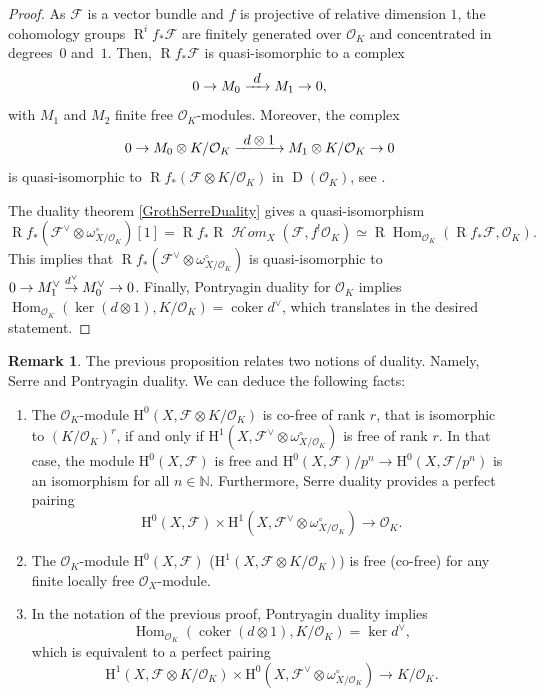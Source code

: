 \documentclass[JEP,XML,SOM,Unicode,published]{cedram}
\newcommand\To[1]{\mathchoice{\xrightarrow{\textstyle\kern4pt#1\kern3pt}}{\stackrel{#1}{\to}}{}{}}
\numberwithin{equation}{section}
\theoremstyle{definition}
\newtheorem{remark}[prop]{Remark}
\newcommand{\bb}[1]{\mathbb{#1}}
\newcommand{\n}[1]{\mathcal{#1}}
\newcommand{\s}[1]{\mathscr{#1}}
\DeclareMathOperator{\R}{R}
\DeclareMathOperator{\D}{D}
\DeclareMathOperator{\Hom}{Hom}
\DeclareMathOperator{\coker}{coker}
\DeclareMathOperator{\sHom}{\s{H}\!\mathit{om}}
\begin{document}
\begin{proof}
As $\n{F}$ is a vector bundle and $f$ is projective of relative dimension $1$, the cohomology groups $\R^i f_* \n{F}$ are finitely generated over $\n{O}_K$ and concentrated in degrees~$0$ and~$1$. Then, $\R f_* \n{F}$ is quasi-isomorphic to a complex
\[
0 \to M_0 \To{d}M_1\to 0,
\]
with $M_1$ and $M_2$ finite free $\n{O}_K$-modules. Moreover, the complex
\[
0 \to M_0\otimes K/\n{O}_K \To{d\otimes 1} M_1\otimes K/\n{O}_K \to 0
\]
is quasi-isomorphic to $\R f_*(\n{F}\otimes K/\n{O}_K)$ in $\D(\n{O}_K)$, see \cite[Th.\,5.2]{mumford1974abelian}.

The duality theorem \ref{GrothSerreDuality} gives a quasi-isomorphism
\[
\R f_*(\n{F}^{\vee}\otimes \omega^{\circ}_{X/\n{O}_K})[1] =\R f_*\R\sHom_{X}(\n{F}, f^!\n{O}_K)\simeq \R\Hom_{\n{O}_K}(\R f_*\n{F}, \n{O}_K).
\]
This implies that $\R f_* (\n{F}^\vee \otimes \omega_{X/\n{O}_K}^\circ)$ is quasi-isomorphic to $0 \to M_1^\vee \To{d^\vee}M_0^\vee \to 0$. Finally, Pontryagin duality for $\n{O}_K$ implies $\Hom_{\n{O}_K}(\ker(d\otimes 1), K/\n{O}_K)= \coker d^\vee$, which translates in the desired statement.
\end{proof}

\begin{remark}
\label{Remarkduality}
The previous proposition relates two notions of duality. Namely, Serre and Pontryagin duality. We can deduce the following facts:

\begin{enumerate}

\item\label{Remarkduality1} The $\n{O}_K$-module $\mathrm{H}^0(X, \n{F}\otimes K/\n{O}_K)$ is co-free of rank $r$, that is isomorphic to $(K/\n{O}_K)^r$, if and only if $\mathrm{H}^1(X, \n{F}^\vee \otimes \omega_{X/\n{O}_K}^{\circ})$ is free of rank $r$. In that case, the module $\mathrm{H}^0(X, \n{F})$ is free and $\mathrm{H}^0(X, \n{F})/p^n \to \mathrm{H}^0(X,\n{F}/p^n)$ is an isomorphism for all $n\in \bb{N}$. Furthermore, Serre duality provides a perfect pairing
\[
\mathrm{H}^0(X, \n{F}) \times \mathrm{H}^1(X, \n{F}^\vee \otimes \omega^\circ_{X/\n{O}_K})\to \n{O}_K.
\]

\item\label{Remarkduality2} The $\n{O}_K$-module $\mathrm{H}^0(X,\n{F})$ (\resp $\mathrm{H}^1(X, \n{F}\otimes K/\n{O}_K)$) is free (\resp co-free) for any finite locally free $\s{O}_X$-module.

\item\label{Remarkduality3} In the notation of the previous proof, Pontryagin duality implies
\[\Hom_{\n{O}_K}(\coker(d\otimes 1), K/\n{O}_K)=\ker d^{\vee},\]
which is equivalent to a perfect pairing
\[
\mathrm{H}^1(X, \n{F}\otimes K/\n{O}_K) \times \mathrm{H}^0(X,\n{F}^\vee\otimes \omega_{X/\n{O}_K}^\circ)\to K/\n{O}_K.
\]
\end{enumerate}
\end{remark}
\end{document}
